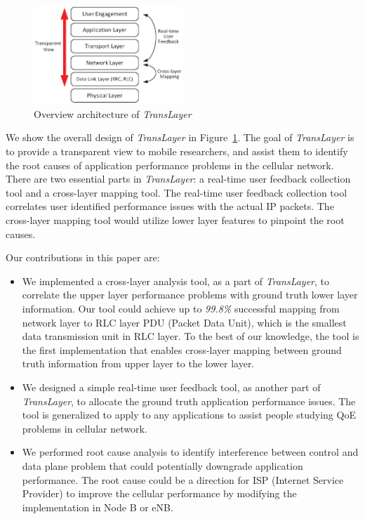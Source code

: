 \begin{figure}[t!]
\centering
\includegraphics[width=0.5\textwidth]{figs/transLayer_overview.eps}
\caption{Overview architecture of \textit{TransLayer}}
\label{fig:translayer.overview}
\end{figure}

We show the overall design of \textit{TransLayer} in Figure~\ref{fig:translayer.overview}. The goal of \textit{TransLayer} is to provide a transparent view to mobile researchers, and assist them to identify the root causes of application performance problems in the cellular network. There are two essential parts in \textit{TransLayer}: a real-time user feedback collection tool and a cross-layer mapping tool. The real-time user feedback collection tool correlates user identified performance issues with the actual IP packets. The cross-layer mapping tool would utilize lower layer features to pinpoint the root causes.

Our contributions in this paper are:
\begin{itemize}
	\item
	We implemented a cross-layer analysis tool, as a part of \textit{TransLayer}, to correlate the upper layer performance problems with ground truth lower layer information. Our tool could achieve up to \textit{99.8\%} successful mapping from network layer to RLC layer PDU (Packet Data Unit), which is the smallest data transmission unit in RLC layer. To the best of our knowledge, the tool is the first implementation that enables cross-layer mapping between ground truth information from upper layer to the lower layer.
	\item
	We designed a simple real-time user feedback tool, as another part of \textit{TransLayer}, to allocate the ground truth application performance issues. The tool is generalized to apply to any applications to assist people studying QoE problems in cellular network.
	\item
	We performed root cause analysis to identify interference between control and data plane problem that could potentially downgrade application performance. The root cause could be a direction for ISP (Internet Service Provider) to improve the cellular performance by modifying the implementation in Node B or eNB.
\end{itemize}


